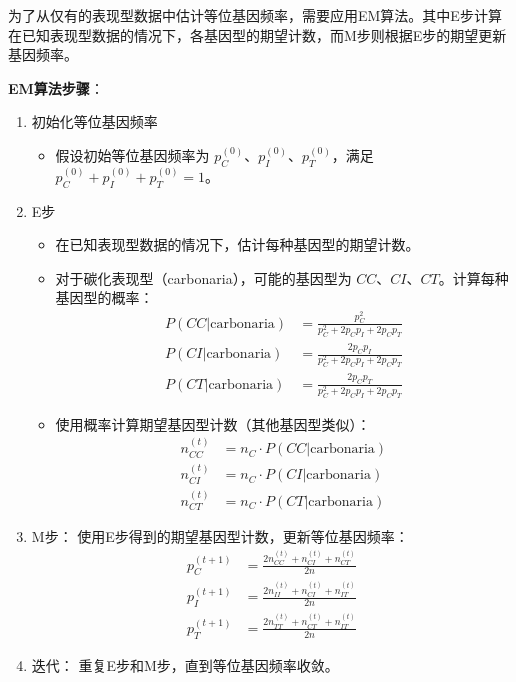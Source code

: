 \documentclass[a4paper,12pt]{ctexart} %
\begin{document}
为了从仅有的表现型数据中估计等位基因频率，需要应用EM算法。其中E步计算在已知表现型数据的情况下，各基因型的期望计数，而M步则根据E步的期望更新基因频率。

\textbf{EM算法步骤}：
\begin{enumerate}
    \item 初始化等位基因频率
    \begin{itemize}
        \item 假设初始等位基因频率为 $p_C^{(0)}$、$p_I^{(0)}$、$p_T^{(0)}$，满足 $p_C^{(0)} + p_I^{(0)} + p_T^{(0)} = 1$。
    \end{itemize}
    
    \item E步
    \begin{itemize}
        \item 在已知表现型数据的情况下，估计每种基因型的期望计数。
        \item 对于碳化表现型（carbonaria），可能的基因型为 $CC$、$CI$、$CT$。计算每种基因型的概率：
        \begin{align*}
            P(CC | \text{carbonaria}) &= \frac{p_C^2}{p_C^2 + 2p_Cp_I + 2p_Cp_T} \\
            P(CI | \text{carbonaria}) &= \frac{2p_Cp_I}{p_C^2 + 2p_Cp_I + 2p_Cp_T} \\
            P(CT | \text{carbonaria}) &= \frac{2p_Cp_T}{p_C^2 + 2p_Cp_I + 2p_Cp_T}
        \end{align*}
        \item 使用概率计算期望基因型计数（其他基因型类似）：      
        \begin{align*}
        n_{CC}^{(t)} &= n_C \cdot P(CC | \text{carbonaria}) \\
        n_{CI}^{(t)} &= n_C \cdot P(CI | \text{carbonaria}) \\
        n_{CT}^{(t)} &= n_C \cdot P(CT | \text{carbonaria})
        \end{align*}
    \end{itemize}
    
    \item M步： 使用E步得到的期望基因型计数，更新等位基因频率：
        \begin{align*}
        p_C^{(t+1)} &= \frac{2n_{CC}^{(t)} + n_{CI}^{(t)} + n_{CT}^{(t)}}{2n} \\
        p_I^{(t+1)} &= \frac{2n_{II}^{(t)} + n_{CI}^{(t)} + n_{IT}^{(t)}}{2n} \\
        p_T^{(t+1)} &= \frac{2n_{TT}^{(t)} + n_{CT}^{(t)} + n_{IT}^{(t)}}{2n}
        \end{align*}
    
    \item 迭代： 重复E步和M步，直到等位基因频率收敛。
\end{enumerate}
\end{document}
